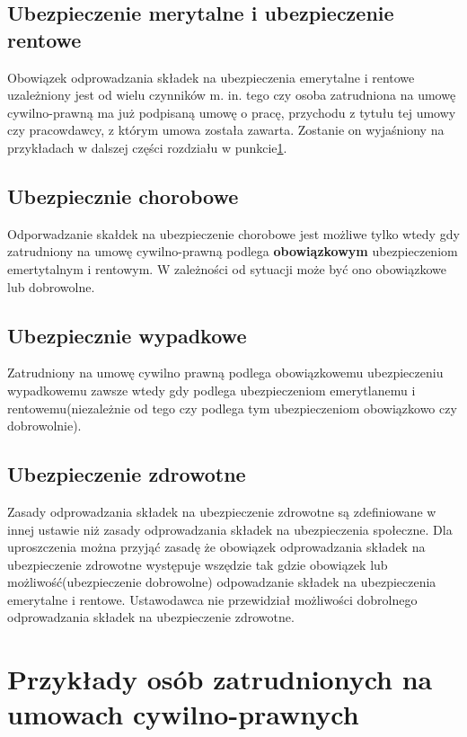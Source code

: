 \subsection[Ubezpieczenie merytalne i ubezpieczenie rentowe][Ubezpieczenie merytalne i ubezpieczenie rentowe]{Ubezpieczenie merytalne i ubezpieczenie rentowe}
Obowiązek odprowadzania składek na ubezpieczenia emerytalne i rentowe uzależniony jest od wielu czynników m. in. tego czy osoba zatrudniona na umowę cywilno-prawną ma już podpisaną umowę o pracę, przychodu z tytułu tej umowy czy pracowdawcy, z którym umowa została zawarta. Zostanie on wyjaśniony na przykładach w dalszej części rozdziału w punkcie\ref{przykladyOsob}.

\subsection[Ubezpiecznie chorobowe][Ubezpiecznie chorobowe]{Ubezpiecznie chorobowe}
Odporwadzanie skałdek na ubezpieczenie chorobowe jest możliwe tylko wtedy gdy zatrudniony na umowę cywilno-prawną podlega \textbf{obowiązkowym} ubezpieczeniom emertytalnym i rentowym. W zależności od sytuacji może być ono obowiązkowe lub dobrowolne.

\subsection[Ubezpiecznie wypadkowe][Ubezpiecznie wypadkowe]{Ubezpiecznie wypadkowe}
Zatrudniony na umowę cywilno prawną podlega obowiązkowemu ubezpieczeniu wypadkowemu zawsze wtedy gdy podlega ubezpieczeniom emerytlanemu i rentowemu(niezależnie od tego czy podlega tym ubezpieczeniom obowiązkowo czy dobrowolnie).

\subsection[Ubezpieczenie zdrowotne][Ubezpieczenie zdrowotne]{Ubezpieczenie zdrowotne}
Zasady odprowadzania składek na ubezpieczenie zdrowotne są zdefiniowane w innej ustawie niż zasady odprowadzania składek na ubezpieczenia społeczne. Dla uproszczenia można przyjąć zasadę że obowiązek odprowadzania składek na ubezpieczenie zdrowotne występuje wszędzie tak gdzie obowiązek lub możliwość(ubezpieczenie dobrowolne) odpowadzanie składek na ubezpieczenia emerytalne i rentowe. Ustawodawca nie przewidział możliwości dobrolnego odprowadzania składek na ubezpieczenie zdrowotne.

\section[Przykłady osób zatrudnionych na umowach cywilno-prawnych][Przykłady osób zatrudnionych na umowach cywilno-prawnych]{Przykłady osób zatrudnionych na umowach cywilno-prawnych}
\label{przykladyOsob}

